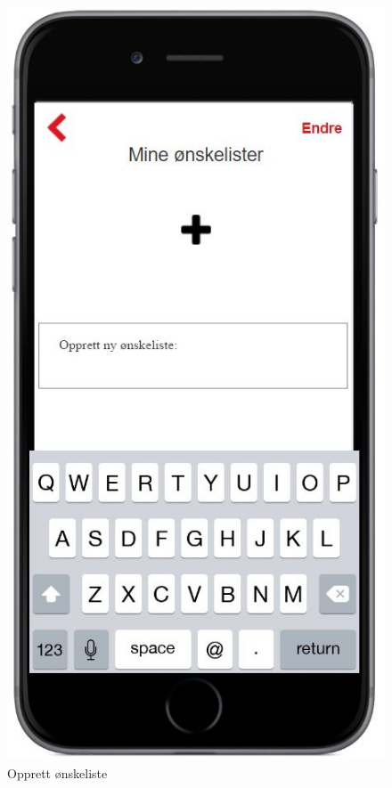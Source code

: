 \begin{figure}[H]
\includegraphics[scale=0.55]{images/axurebilder/opprett_onskeliste_2}
\centering %
\caption{Opprett ønskeliste}
\label{fig:opprett_onskeliste_2}
\end{figure}

